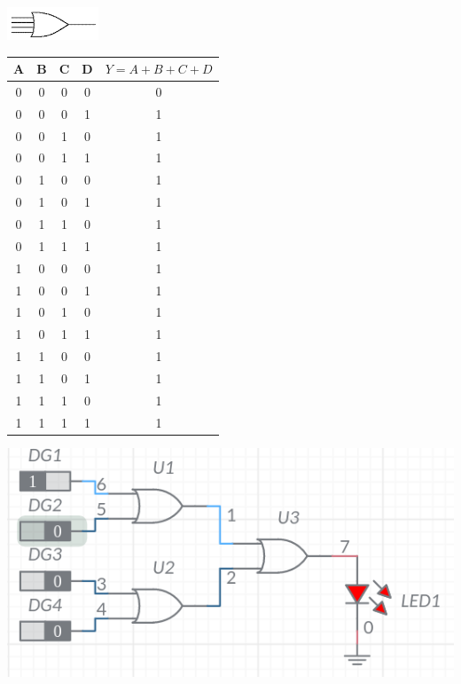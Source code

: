 \documentclass[a4paper, 12pt]{article}
\begin{document}
\begin{minipage}[c]{.5\textwidth}
  \centering
    \includegraphics{4-input-or-gate}
\end{minipage}
\begin{minipage}{.5\textwidth}
  \begin{center}
    \begin{tabular}{ |c|c|c|c|c| }
      \hline
      A & B & C & D & $Y = A+B+C+D$ \\
      \hline
      0 & 0 & 0 & 0 & 0 \\
      \hline
      0 & 0 & 0 & 1 & 1 \\
      \hline
      0 & 0 & 1 & 0 & 1 \\
      \hline
      0 & 0 & 1 & 1 & 1 \\
      \hline
      0 & 1 & 0 & 0 & 1 \\
      \hline
      0 & 1 & 0 & 1 & 1 \\
      \hline
      0 & 1 & 1 & 0 & 1 \\
      \hline
      0 & 1 & 1 & 1 & 1 \\
      \hline
      1 & 0 & 0 & 0 & 1 \\
      \hline
      1 & 0 & 0 & 1 & 1 \\
      \hline
      1 & 0 & 1 & 0 & 1 \\
      \hline
      1 & 0 & 1 & 1 & 1 \\
      \hline
      1 & 1 & 0 & 0 & 1 \\
      \hline
      1 & 1 & 0 & 1 & 1 \\
      \hline
      1 & 1 & 1 & 0 & 1 \\
      \hline
      1 & 1 & 1 & 1 & 1 \\
      \hline
    \end{tabular}
  \end{center}
\end{minipage}

\begin{centering}
  \includegraphics[scale=0.5]{4-input-or}
\end{centering}
\end{document}
